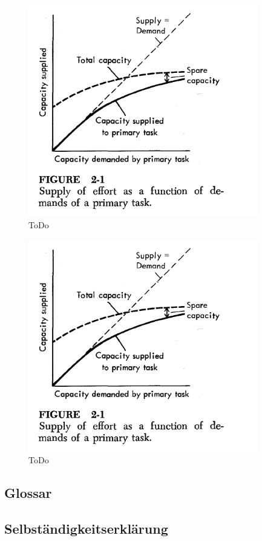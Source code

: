 \documentclass{llncs}					%
\begin{document}
\begin{figure}[htbp]
	\begin{center}
		\includegraphics[width = 10cm]{Grafiken/28-Attetntion-Reserves.png}
		\caption{ToDo}
		\label{28-Attetntion-Reserves}
	\end{center}
\end{figure}

\begin{figure}[htbp]
	\begin{center}
		\includegraphics[width = 10cm]{Grafiken/28-Recursive-Exploration-of-novel-Stimuli.png}
		\caption{ToDo}
		\label{28-Recursive-Exploration-of-novel-Stimuli}
	\end{center}
\end{figure}


\clearpage
\subsection{Glossar}\label{glossar}

\renewcommand*{\glossarysection}[2][]{}	%
\printnoidxglossaries				%

\subsection{Selbständigkeitserklärung}

\clearpage

\end{document}
